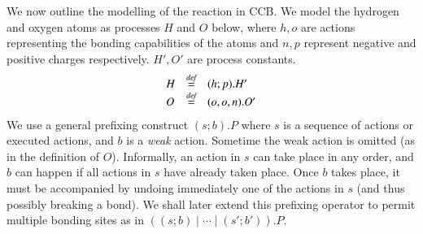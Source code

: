 \documentclass[review]{elsarticle}
\newcommand{\bydef}{\stackrel{\emph{def}}{=}}
\begin{document}
We now outline the modelling of the reaction in CCB.  %
We model the hydrogen and oxygen atoms as processes $H$ and $O$ below, where 
$h,o$ are actions representing the bonding capabilities of the atoms and $n,p$ 
represent negative and positive charges respectively. $H',O'$ are process constants.
$$\begin{array}{lll}
H & \bydef & (h;p).H'\\
O & \bydef & (o,o,n).O'
\end{array}$$
We use a general prefixing construct $(s;b).P$ where $s$ is a sequence of actions or executed 
actions, and $b$ is a \emph{weak} action. Sometime the weak action is omitted 
(as in the definition of $O$). Informally, an action in $s$ can take place in any order, 
and $b$ can happen if
all actions in $s$ have already taken place. Once $b$ takes place, it must be accompanied by
undoing immediately one of the actions in $s$ (and thus possibly breaking a bond). We shall later extend
this prefixing operator to permit multiple bonding sites as in $((s;b)\mid \cdots\mid (s';b')).P$.
\end{document}
